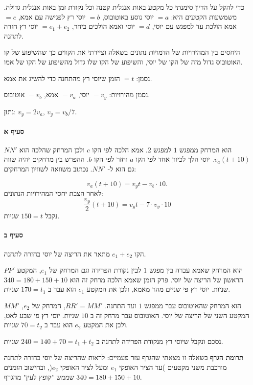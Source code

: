 \documentclass[12pt,a4paper]{article}
\begin{document}
כדי להקל על הדיון סימנתי כל מקטע באות אנגלית קטנה וכל נקודת זמן באות אנגלית גדולה. משמשעות הקטעים היא:
$=a$
יוסי נוסע באוטובוס,
$=b$
יוסי רץ לפגישה עם אמא,
$=c$
אמא הולכת עד למפגש עם יוסי,
$=d$
יוסי ואמא הולכים ביחד,
$=e_1+e_2$
יוסי רץ חזרה לתחנה.

היחסים בין המהירויות של הדמויות נתונים בשאלה וציירתי את הקווים כך שהשיפוע של קו האוטובוס גדול מזה של הקו של יוסי, והשיפוע של הקו שלו גדול מהשיפוע של הקו של אמו.


נסמן:
$=t$
הזמן שיוסי רץ מהתחנה כדי להשיג את אמא.

נסמן מהירויות:
$=v_y$
יוסי, 
$=v_a$
אמא, 
$=v_b$
אוטובוס.


נתון:
$v_y=2v_a$, $v_y=v_b/7$.


\paragraph{סעיף א}

$NN'$
הוא המרחק ממפגש
$1$
למפגש
$2$.
אמא הלכה לפי הקו
$c$
ולכן המרחק שהלכה הוא
$v_a(t+10)$.
יוסי הלך לכיוון אחד לפי הקו
$a$
וחזר לפי הקו
$b$.
ההפרש בין מרחקים יהיה שווה גם הוא ל-
$NN'$.
נכתוב משוואה לשוויון המרחקים:

\[
v_a(t+10) = v_yt - v_b \cdot 10.
\]
לאחר הצבת יחסי המהירויות הנתונים:
\[
\frac{v_y}{2}(t+10) = v_yt - 7\cdot v_y\cdot 10
\]
נקבל 
$150=t$
שניות.


\paragraph{סעיף ב}

הקו
$e_1+e_2$
מתאר את הריצה של יוסי בחזרה לתחנה.


$PP'$
הוא המרחק שאמא עברה בין מפגש
$1$
לבין נקודת הפרידה וגם המרחק של
$e_1$,
המקטע הראשון של הריצה של יוסי. פרק הזמן שאמא הלכה מרחק זה הוא
$340=180+150+10$
שניות. יוסי רץ פי שניים מהר מאמא, ולכן את המקטע
$e_1$
הוא עבר ב
$170=t_1$
שניות.


$MM'$
הוא המרחק שהאוטובוס עבר ממפגש
$1$
ועד התחנה.
$RR'=MM'$,
המרחק של
$e_2$,
המקטע השני של הריצה של יוסי. האוטובוס עבר מרחק זה ב
$10$
שניות. יוסי רץ פי שבע לאט, ולכן את המקטע
$e_2$
הוא עבר ב
$70=t_2$
שניות.


נסכם ונקבל שיוסי רץ מנקודת הפרידה לתחנה ב
$240=140+70=t_1+t_2$
שניות.


\textbf{תרומת הגרף}
בשאלה זו מצאתי שהגרף עזר פעמיים: לראות שהריצה של יוסי בחזרה לתחנה מורכבת משני מקטעים )עד הציר האופקי
$e_1$
ומעל לציר האופקי
$e_2$(,
ובחישוב הזמנים
$340=180+150+10$
שממש "קופץ לעין" מהגרף.
\end{document}
